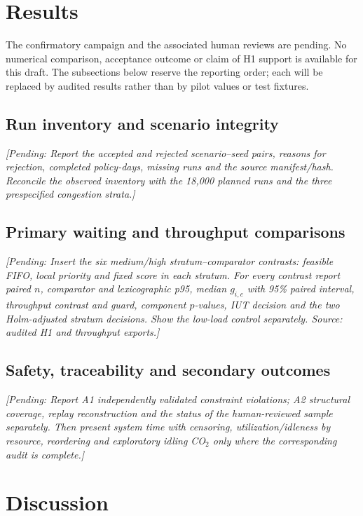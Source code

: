 \documentclass[12pt,a4paper]{article}
\newcommand{\pending}[1]{\textcolor{black!70}{\emph{[Pending: #1]}}}
\begin{document}
\section{Results}

The confirmatory campaign and the associated human reviews are pending. No numerical comparison, acceptance outcome or claim of H1 support is available for this draft. The subsections below reserve the reporting order; each will be replaced by audited results rather than by pilot values or test fixtures.

\subsection{Run inventory and scenario integrity}

\pending{Report the accepted and rejected scenario--seed pairs, reasons for rejection, completed policy-days, missing runs and the source manifest/hash. Reconcile the observed inventory with the 18,000 planned runs and the three prespecified congestion strata.}

\subsection{Primary waiting and throughput comparisons}

\pending{Insert the six medium/high stratum--comparator contrasts: feasible FIFO, local priority and fixed score in each stratum. For every contrast report paired $n$, comparator and lexicographic p95, median $g_{i,c}$ with 95\% paired interval, throughput contrast and guard, component $p$-values, IUT decision and the two Holm-adjusted stratum decisions. Show the low-load control separately. Source: audited H1 and throughput exports.}

\subsection{Safety, traceability and secondary outcomes}

\pending{Report A1 independently validated constraint violations; A2 structural coverage, replay reconstruction and the status of the human-reviewed sample separately. Then present system time with censoring, utilization/idleness by resource, reordering and exploratory idling CO$_2$ only where the corresponding audit is complete.}

\section{Discussion}
\end{document}
